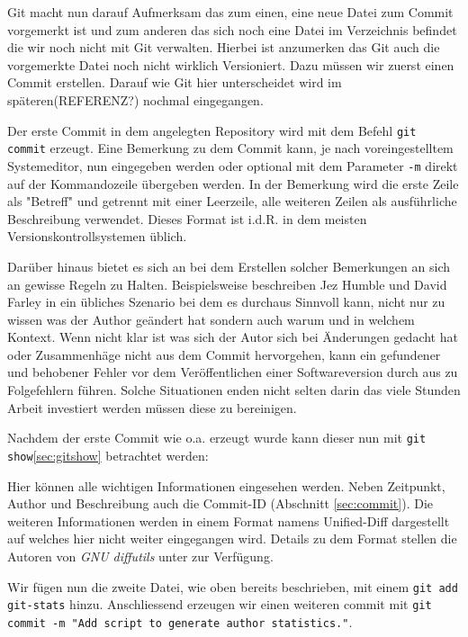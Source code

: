 Git macht nun darauf Aufmerksam das zum einen, eine neue Datei zum Commit
vorgemerkt ist und zum anderen das sich noch eine Datei im Verzeichnis befindet
die wir noch nicht mit Git verwalten. Hierbei ist anzumerken das Git auch die
vorgemerkte Datei noch nicht wirklich Versioniert. Dazu müssen wir zuerst einen
Commit erstellen. Darauf wie Git hier unterscheidet wird im späteren(REFERENZ?)
nochmal eingegangen.

Der erste Commit in dem angelegten Repository wird mit dem Befehl \texttt{git
commit} erzeugt. Eine Bemerkung zu dem Commit kann, je nach voreingestelltem
Systemeditor, nun eingegeben werden oder optional mit dem Parameter \texttt{-m}
direkt auf der Kommandozeile übergeben werden. In der Bemerkung wird die erste
Zeile als "Betreff" und getrennt mit einer Leerzeile, alle weiteren Zeilen als
ausführliche Beschreibung verwendet. Dieses Format ist i.d.R. in dem meisten
Versionskontrollsystemen üblich.

Darüber hinaus bietet es sich an bei dem Erstellen solcher Bemerkungen an sich
an gewisse Regeln zu Halten. Beispielsweise beschreiben Jez Humble und David
Farley in \cite[S.~37]{cd} ein übliches Szenario bei dem es durchaus Sinnvoll
kann, nicht nur zu wissen was der Author geändert hat sondern auch warum
und in welchem Kontext. Wenn nicht klar ist was sich der Autor sich bei
Änderungen gedacht hat oder Zusammenhäge nicht aus dem Commit hervorgehen, kann
ein gefundener und behobener Fehler vor dem Veröffentlichen einer
Softwareversion durch aus zu Folgefehlern führen. Solche Situationen enden
nicht selten darin das viele Stunden Arbeit investiert werden müssen diese zu
bereinigen.

Nachdem der erste Commit wie o.a. erzeugt wurde kann dieser nun mit \texttt{git
show}\ref{sec:gitshow} betrachtet werden:



Hier können alle wichtigen Informationen eingesehen werden. Neben Zeitpunkt,
Author und Beschreibung auch die Commit-ID (Abschnitt \ref{sec:commit}). Die
weiteren Informationen werden in einem Format namens Unified-Diff dargestellt
auf welches hier nicht weiter eingegangen wird. Details zu dem Format stellen
die Autoren von \textit{GNU diffutils} unter \cite[S.~12-13]{paper:diffutils}
zur Verfügung.

Wir fügen nun die zweite Datei, wie oben bereits beschrieben, mit einem
\texttt{git add git-stats} hinzu. Anschliessend erzeugen wir einen weiteren
\gls{commit} mit \texttt{git commit -m "Add script to generate author
statistics."}.

